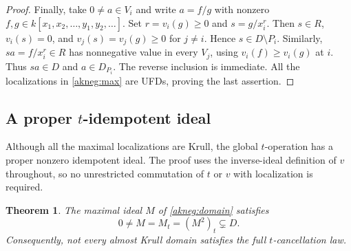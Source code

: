 \documentclass[11pt]{amsart}
\newtheorem{theorem}{Theorem}[section]
\theoremstyle{definition}
\theoremstyle{remark}
\begin{document}
\begin{proof}
Finally, take $0\ne a\in V_i$ and write $a=f/g$ with nonzero
$f,g\in k[x_1,x_2,\ldots,y_1,y_2,\ldots]$.  Set $r=v_i(g)\ge0$ and
$s=g/x_i^r$.  Then $s\in R$, $v_i(s)=0$, and $v_j(s)=v_j(g)\ge0$ for
$j\ne i$.  Hence $s\in D\setminus P_i$.  Similarly,
$sa=f/x_i^r\in R$ has nonnegative value in every $V_j$, using
$v_i(f)\ge v_i(g)$ at $i$.  Thus $sa\in D$ and $a\in D_{P_i}$.
The reverse inclusion is immediate.  All the localizations in
\eqref{akneg:max} are UFDs, proving the last assertion.
\end{proof}

\subsection{A proper \texorpdfstring{$t$}{t}-idempotent ideal}

Although all the maximal localizations are Krull, the global $t$-operation
has a proper nonzero idempotent ideal.  The proof uses the inverse-ideal
definition of $v$ throughout, so no unrestricted commutation of $t$ or $v$
with localization is required.

\begin{theorem}\label{akneg:main}
The maximal ideal $M$ of \eqref{akneg:domain} satisfies
\begin{equation}\label{akneg:idempotent}
 0\ne M=M_t=(M^2)_t\subsetneq D.
\end{equation}
Consequently, not every almost Krull domain satisfies the full
$t$-cancellation law.
\end{theorem}
\end{document}
